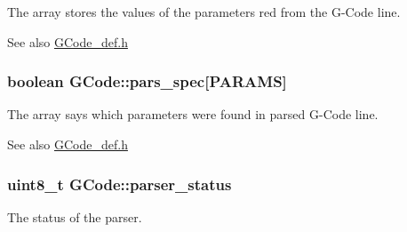 The array stores the values of the parameters red from the G-\/\+Code line. 

\begin{DoxySeeAlso}{See also}
\hyperlink{_g_code__def_8h}{G\+Code\+\_\+def.\+h} 
\end{DoxySeeAlso}
\hypertarget{class_g_code_a6d11b02685ef1b387a3c9da004547006}{
\subsubsection[{pars\+\_\+spec}]{\setlength{\rightskip}{0pt plus 5cm}boolean G\+Code\+::pars\+\_\+spec\mbox{[}{\bf P\+A\+R\+A\+M\+S}\mbox{]}}}\label{class_g_code_a6d11b02685ef1b387a3c9da004547006}


The array says which parameters were found in parsed G-\/\+Code line. 

\begin{DoxySeeAlso}{See also}
\hyperlink{_g_code__def_8h}{G\+Code\+\_\+def.\+h} 
\end{DoxySeeAlso}
\hypertarget{class_g_code_a56d0e5e56115cd8e7b3f161cc8c0528e}{
\subsubsection[{parser\+\_\+status}]{\setlength{\rightskip}{0pt plus 5cm}uint8\+\_\+t G\+Code\+::parser\+\_\+status}}\label{class_g_code_a56d0e5e56115cd8e7b3f161cc8c0528e}


The status of the parser. 


